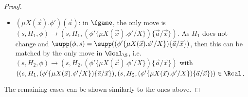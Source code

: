 \begin{proof}
\begin{itemize}
        By definition, we know $\supp(s') \subseteq \supp(s) \cup \{\vec a\}$ and $H_1' = H_1 \cup \{\vec a\}$. 
        If $|H_1'| \le \S$, then this is matched by some move $(s,H_2,\phi) \rightarrow (s', H_2', \phi')$ with $H_2' = H_2 \cup \{\vec a\}$ and $((s', H_1', \phi'),(s',H_1',\phi')) \in \Rcal$. 
        Otherwise, we can see that $|H_2 \cup \{\vec a\}| > \S$. This can be matched by some move $(s,H_2,\phi) \rightarrow (s', H_2', \phi')$ with $H_1' \cap \supp(\phi', s') \subseteq H_2' \subseteq H_1'$ and $|H_2'| = \S + 1$. 
        As $|\supp(\phi',s')| \le \S$, we have that such a $H_2'$ exists and $((s', H_1', \phi'),(s',H_2',\phi')) \in \Rcal$ as required.
        \\
        Conversely, let $(s, H_2, \phi) \rightarrow (s', H_2', \phi')$ with $s\xrightarrow{t, \vec a} s'$. One of the following is the case:
        \begin{itemize}
            \item $|H_2 \cup \{\vec a\}| \le \S$, then $H_2' = H_1 \cup \{\vec a\}$. 
            This can be matched by the move $(s, H_1, \phi) \rightarrow (s', H_1', \phi')$ with $H_1' = H_1 \cup \{\vec a\}$ and $((s', H_1', \phi'),(s',H_2',\phi')) \in \Rcal$.
            \item $|H_2 \cup \{\vec a\}| > \S$ and $(H_2 \cup \{\vec a\}) \cap \supp(s', \phi') \subseteq H_2' \subseteq H_2 \cup \{\vec a\}$ with $|H_2'| = \S + 1$. 
            As $\supp(s') \subseteq \supp(s) \cup \{\vec a\}$ and $\supp(\phi) = \supp(\phi') \cup \{\vec a\}$, we have:
            \begin{align*}
                (H_1 \cup \{\vec a\}) \cap \supp(s', \phi') &= ((H_1\setminus\{\vec a\}) \cap \supp(s', \phi')) \cup (\{\vec a\} \cap \supp(s', \phi'))
                \\
                &\subseteq (H_2 \cap \supp(s', \phi')) \cup (\{\vec a\} \cap \supp(s', \phi'))\subseteq H_2' 
                            \end{align*}
            Thus, the move can be matched by $(s, H_1, \phi) \rightarrow (s', H_1', \phi')$ with $H_1' = H_1 \cup \{\vec a\}$ and $((s', H_1', \phi'),(s',H_2',\phi')) \in \Rcal$.
        \end{itemize}
                \item $(\mu X(\vec x).\phi')(\vec a)$: in $\fgame$, the only move is $(s, H_1, \phi) \rightarrow (s, H_1, (\phi'\{\mu X(\vec x).\phi'/X\})\{\vec a/\vec x\})$. As $H_1$ does not change and $\supp(\phi, s) = \supp((\phi'\{\mu X(\vec x).\phi'/X\})\{\vec a/\vec x\})$, then this can be matched by the only move in $\Gcal_\S$, i.e.\ $(s, H_2, \phi) \rightarrow (s, H_2, (\phi'\{\mu X(\vec x).\phi'/X\})\{\vec a/\vec x\})$ with $((s, H_1, (\phi'\{\mu X(\vec x).\phi'/X\})\{\vec a/\vec x\}), (s, H_2, (\phi'\{\mu X(\vec x).\phi'/X\})\{\vec a/\vec x\})) \in \Rcal$. 
            \end{itemize} 
The remaining cases can be shown similarly to the ones above.
  \end{proof}

